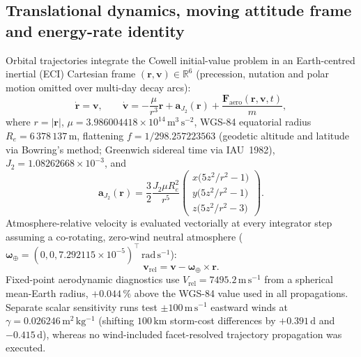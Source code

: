 \documentclass[12pt]{article}
\newcommand{\unit}[1]{\,\mathrm{#1}}
\begin{document}
\subsection{Translational dynamics, moving attitude frame and energy-rate identity}
\label{sec:frames}

Orbital trajectories integrate the Cowell initial-value problem in an Earth-centred inertial (ECI) Cartesian frame $(\mathbf{r}, \mathbf{v}) \in \mathbb{R}^6$ (precession, nutation and polar motion omitted over multi-day decay arcs):
\begin{equation}
\dot{\mathbf{r}} = \mathbf{v},\qquad
\dot{\mathbf{v}} = -\frac{\mu}{r^3}\mathbf{r} + \mathbf{a}_{J_2}(\mathbf{r}) + \frac{\mathbf{F}_{\mathrm{aero}}(\mathbf{r},\mathbf{v},t)}{m},
\label{eq:cowell}
\end{equation}
where $r = |\mathbf{r}|$, $\mu = 3.986004418\times10^{14}\unit{m^3\,s^{-2}}$, WGS-84 equatorial radius $R_e = 6\,378\,137\unit{m}$, flattening $f = 1/298.257223563$ (geodetic altitude and latitude via Bowring's method; Greenwich sidereal time via IAU~1982), $J_2 = 1.08262668\times10^{-3}$, and
\begin{equation}
\mathbf{a}_{J_2}(\mathbf{r})
  = \frac{3}{2}\frac{J_2 \mu R_e^2}{r^5}
    \begin{pmatrix}
      x\bigl(5 z^2/r^2 - 1\bigr) \\[2pt]
      y\bigl(5 z^2/r^2 - 1\bigr) \\[2pt]
      z\bigl(5 z^2/r^2 - 3\bigr)
    \end{pmatrix}.
\label{eq:j2}
\end{equation}
Atmosphere-relative velocity is evaluated vectorially at every integrator step assuming a co-rotating, zero-wind neutral atmosphere ($\boldsymbol{\omega}_\oplus = (0,0,7.292115\times10^{-5})^\top\unit{rad\,s^{-1}}$):
\begin{equation}
\mathbf{v}_{\mathrm{rel}} = \mathbf{v} - \boldsymbol{\omega}_\oplus \times \mathbf{r}.
\label{eq:vrel}
\end{equation}
Fixed-point aerodynamic diagnostics use $V_{\mathrm{rel}} = 7495.2\unit{m\,s^{-1}}$ from a spherical mean-Earth radius, $+0.044\,\%$ above the WGS-84 value used in all propagations. Separate scalar sensitivity runs test $\pm100\unit{m\,s^{-1}}$ eastward winds at $\gamma = 0.026246\unit{m^2\,kg^{-1}}$ (shifting $100\unit{km}$ storm-cost differences by $+0.391\unit{d}$ and $-0.415\unit{d}$), whereas no wind-included facet-resolved trajectory propagation was executed.
\end{document}
